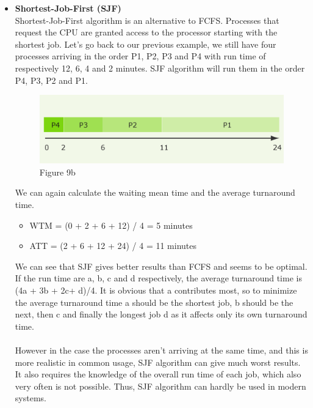 \documentclass[11pt,a4paper]{scrreprt}
\begin{document}
\begin{itemize}
\item \textbf{Shortest-Job-First (SJF)} \\
Shortest-Job-First algorithm is an alternative to FCFS. Processes that request the CPU are granted access to the processor starting with the shortest job. Let's go back to our previous example, we still have four processes arriving in the order P1, P2, P3 and P4 with run time of respectively 12, 6, 4 and 2 minutes. SJF algorithm will run them in the order P4, P3, P2 and P1.
\begin{figure}[!ht]
\centering
\includegraphics[width=0.7\linewidth]{img/Fig9b.png}
\caption{Figure 9b}
\label{fig:figure9b}
\end{figure}
We can again calculate the waiting mean time and the average turnaround time.
\begin{itemize}
\item WTM = (0 + 2 + 6 + 12) / 4 = 5 minutes
\item ATT = (2 + 6 + 12 + 24) / 4 = 11 minutes
\end{itemize}
We can see that SJF gives better results than FCFS and seems to be optimal. If the run time are a, b, c and d respectively, the average turnaround time is (4a + 3b + 2c+ d)/4. It is obvious that a contributes most, so to minimize the average turnaround time a should be the shortest job, b should be the next, then c and finally the longest job d as it affects only its own turnaround time. \\\\
However in the case the processes aren't arriving at the same time, and this is more realistic in common usage, SJF algorithm can give much worst results. It also requires the knowledge of the overall run time of each job, which also very often is not possible. Thus, SJF algorithm can hardly be used in modern systems.

\end{itemize}
\end{document}
